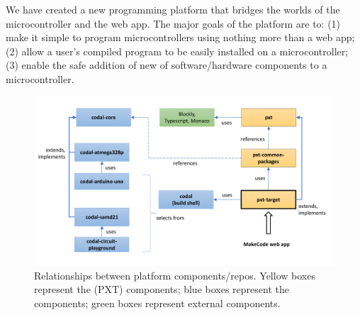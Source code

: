 We have created a new programming platform that bridges the worlds of the microcontroller
and the web app. The major goals of the platform are to: (1)
make it simple to program microcontrollers using nothing more than a web app;
(2) allow a user's compiled program to be easily installed on a microcontroller;
(3) enable the safe addition of new of software/hardware components to a microcontroller.

\begin{figure}[t]
  \includegraphics[width=5.5in]{reposFig.pdf}
  \caption{\label{fig:repos}Relationships between platform components/repos. Yellow boxes represent the \MC (PXT) components; blue
  boxes represent the \CO components; green boxes represent external components.}
\end{figure}

